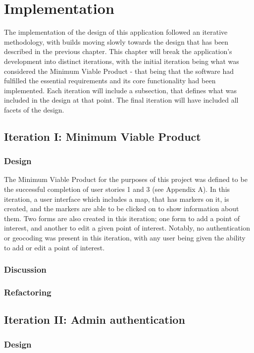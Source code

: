 \chapter{Implementation}

The implementation of the design of this application followed an iterative methodology, with builds moving slowly towards the design that has been described in the previous chapter. This chapter will break the application's development into distinct iterations, with the initial iteration being what was considered the Minimum Viable Product - that being that the software had fulfilled the essential requirements and its core functionality had been implemented. Each iteration will include a subsection, that defines what was included in the design at that point. The final iteration will have included all facets of the design.

\section{Iteration I: Minimum Viable Product}
\subsection{Design}
The Minimum Viable Product for the purposes of this project was defined to be the successful completion of user stories 1 and 3 (see Appendix A). In this iteration, a user interface which includes a map, that has markers on it, is created, and the markers are able to be clicked on to show information about them. Two forms are also created in this iteration; one form to add a point of interest, and another to edit a given point of interest. Notably, no authentication or geocoding was present in this iteration, with any user being given the ability to add or edit a point of interest.

\subsection{Discussion}

\subsection{Refactoring}

\section{Iteration II: Admin authentication}
\subsection{Design}

